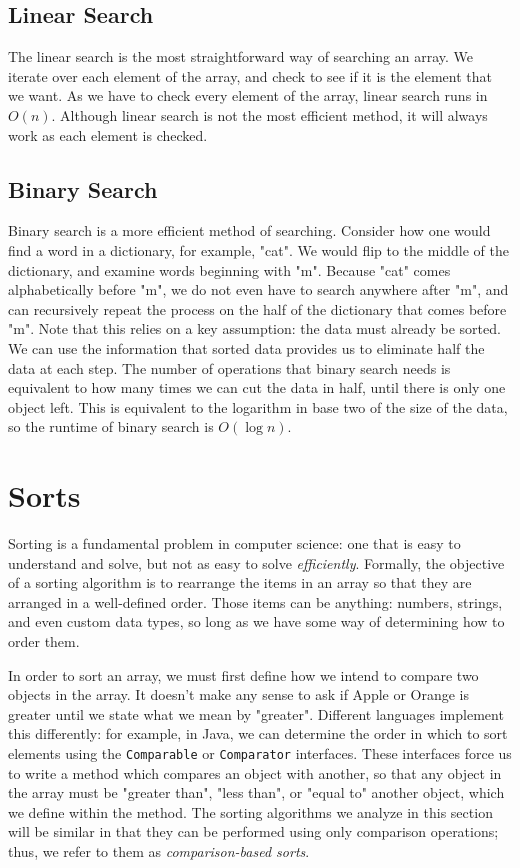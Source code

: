 \subsection{Linear Search}

The linear search is the most straightforward way of searching an array.  We iterate over each element of the array, and check to see if it is the element that we want.  As we have to check every element of the array, linear search runs in $ O(n) $.  Although linear search is not the most efficient method, it will always work as each element is checked.

\subsection{Binary Search}

Binary search is a more efficient method of searching.  Consider how one would find a word in a dictionary, for example, "cat".  We would flip to the middle of the dictionary, and examine words beginning with "m".  Because "cat" comes alphabetically before "m", we do not even have to search anywhere after "m", and can recursively repeat the process on the half of the dictionary that comes before "m".  Note that this relies on a key assumption: the data must already be sorted.  We can use the information that sorted data provides us to eliminate half the data at each step.  The number of operations that binary search needs is equivalent to how many times we can cut the data in half, until there is only one object left.  This is equivalent to the logarithm in base two of the size of the data, so the runtime of binary search is $ O(\log n) $.

\section{Sorts}

Sorting is a fundamental problem in computer science: one that is easy to understand and solve, but not as easy to solve \textit{efficiently}. Formally, the objective of a sorting algorithm is to rearrange the items in an array so that they are arranged in a well-defined order. Those items can be anything: numbers, strings, and even custom data types, so long as we have some way of determining how to order them.

In order to sort an array, we must first define how we intend to compare two objects in the array.  It doesn't make any sense to ask if Apple or Orange is greater until we state what we mean by "greater".  Different languages implement this differently: for example, in Java, we can determine the order in which to sort elements using the \texttt{Comparable} or \texttt{Comparator} interfaces.  These interfaces force us to write a method which compares an object with another, so that any object in the array must be "greater than", "less than", or "equal to" another object, which we define within the method.  The sorting algorithms we analyze in this section will be similar in that they can be performed using only comparison operations; thus, we refer to them as \textit{comparison-based sorts}.

